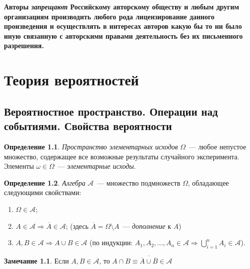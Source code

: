 \documentclass[oneside,final,14pt]{extreport}
\theoremstyle{plain}
\theoremstyle{definition}
\newtheorem*{defn}{Определение}
\newtheorem*{rmrk}{Замечание}
\theoremstyle{named}
\begin{document}
\vspace{1cm}

\textbf{Авторы \textit{запрещают} Российскому авторскому обществу и любым другим организациям производить любого рода лицензирование данного произведения и осуществлять в интересах авторов какую бы то ни было иную связанную с авторскими правами деятельность без их письменного разрешения.}

\tableofcontents %

\chapter{Теория вероятностей}

\section{Вероятностное пространство. Операции над событиями. Свойства вероятности}
\begin{defn}
    {\it Пространство элементарных исходов} $\Omega$~--- любое непустое множество, содержащее все возможные результаты случайного эксперимента. Элементы $\omega \in \Omega$~--- {\it элементарные исходы}.
\end{defn}

\begin{defn}
{\it Алгебра} $\mathcal{A}$~--- множество подмножеств $\Omega$, обладающее следующими свойствами:

\begin{enumerate}
    \item $\Omega \in \mathcal{A}$;
    \item $A \in \mathcal{A} \Rightarrow \overline{A} \in \mathcal{A}$; (здесь $\overline{A} = \Omega \setminus A$~--- {\it дополнение} к $A$)
    \item $A, B \in \mathcal{A} \Rightarrow A \cup B \in \mathcal{A}$ (по индукции: $A_1, A_2, \ldots, A_n \in \mathcal{A} \Rightarrow \bigcup\limits_{i=1}^n A_i \in \mathcal{A}$).
\end{enumerate}
\end{defn}

\begin{rmrk}
    Если $A, B \in \mathcal{A}$, то $A \cap B \equiv \overline{\overline{A} \cup \overline{B}} \in \mathcal{A}$
\end{rmrk}
\end{document}
